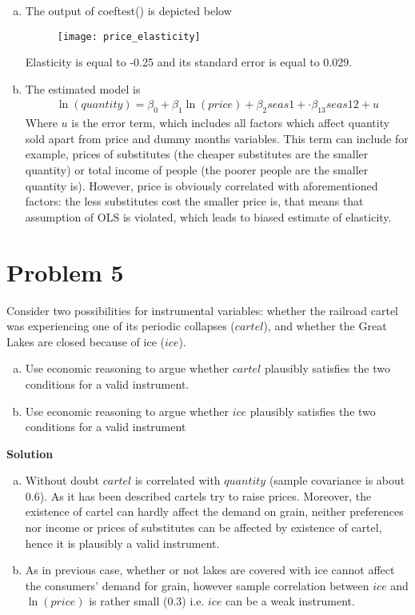 \documentclass[a4paper]{article}
\begin{document}
\begin{enumerate}[(a)]
	\item The output of coeftest() is depicted below
	\begin{figure}[H]
		\centering
		\texttt{[image: price\_elasticity]}
		\caption{}\label{fig1}
	\end{figure}
	Elasticity is equal to -0.25 and its standard error is equal to 0.029.
	\item The estimated model is
	\begin{align*}
	\ln (quantity) = \beta_0 + \beta_1 \ln (price) + \beta_2 seas1 + \cdot \beta_{13} seas12 + u
	\end{align*}
	Where $u$ is the error term, which includes all factors which affect quantity sold apart from price and dummy months variables. This term can include for example, prices of substitutes (the cheaper substitutes are the smaller quantity) or total income of people (the poorer people are the smaller quantity is). However, price is obviously correlated with aforementioned factors: the less substitutes cost the smaller price is, that means that assumption of OLS is violated, which leads to biased estimate of elasticity.
\end{enumerate}
\section*{Problem 5}
Consider two possibilities for instrumental variables: whether the railroad cartel was experiencing one of its periodic collapses ($cartel$), and whether the Great Lakes are closed because
of ice ($ice$).
\begin{enumerate}[(a)]
\item Use economic reasoning to argue whether $cartel$ plausibly satisfies the two conditions
for a valid instrument.
\item Use economic reasoning to argue whether $ice$ plausibly satisfies the two conditions for
a valid instrument
\end{enumerate}

\textbf{Solution}

\begin{enumerate}[(a)]
	\item Without doubt $cartel$ is correlated with $quantity$ (sample covariance is about 0.6). As it has been described cartels try to raise prices. Moreover, the existence of cartel can hardly affect the demand on grain, neither preferences nor income or prices of substitutes can be affected by existence of cartel, hence it is plausibly a valid instrument.
	\item As in previous case, whether or not lakes are covered with ice cannot affect the consumers' demand for grain, however sample correlation between $ice$ and $\ln (price)$ is rather small (0.3) i.e. $ice$ can be a weak instrument.
\end{enumerate}
\end{document}
